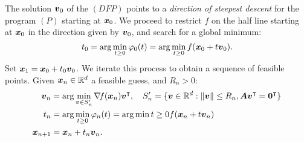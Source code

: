 The solution $\boldsymbol{v}_0$ of the $(DFP)$ points to a \emph{direction of steepest descent} for the program $(P)$ starting at $\boldsymbol{x}_0$.  We proceed to restrict $f$ on the half line starting at $\boldsymbol{x}_0$ in the direction given by $\boldsymbol{v}_0$, and search for a global minimum:
\begin{equation*}
t_0 = \arg\min_{t \geq 0} \varphi_0(t) = \arg \min_{t \geq 0} f(\boldsymbol{x}_0 + t\boldsymbol{v}_0).
\end{equation*}
Set $\boldsymbol{x}_1 = \boldsymbol{x}_0 + t_0\boldsymbol{v}_0$.  We iterate this process to obtain a sequence of feasible points.  Given $\boldsymbol{x}_n \in \mathbb{R}^d$ a feasible guess, and $R_n > 0$:
\begin{align*}
\boldsymbol{v}_n &= \arg\min_{\boldsymbol{v} \in S_n'} \mathop{\nabla\! {f}}(\boldsymbol{x}_n){\boldsymbol{v}}^\intercal, \quad S_n' = \{ \boldsymbol{v} \in \mathbb{R}^d : \lVert \boldsymbol{v} \rVert \leq R_n, \boldsymbol{A}{\boldsymbol{v}}^\intercal={\boldsymbol{0}}^\intercal\} \\
t_n &= \arg\min_{t \geq 0} \varphi_n(t) = \arg\min{t \geq 0} f(\boldsymbol{x}_n + t \boldsymbol{v}_n) \\
\boldsymbol{x}_{n+1} &= \boldsymbol{x}_n + t_n \boldsymbol{v}_n.
\end{align*}

